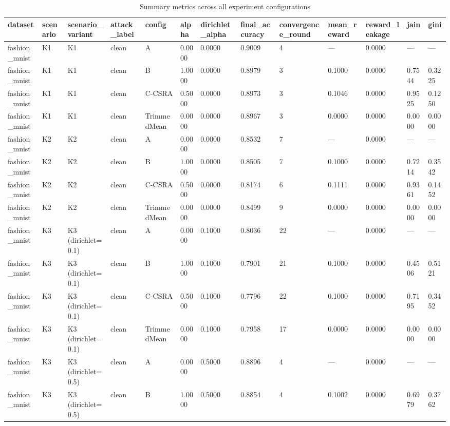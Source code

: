 \begin{table}[htbp]
\centering
\caption{Summary metrics across all experiment configurations}
\label{tab:summary}
\begin{tabular}{lllllllllllll}
\toprule
\textbf{dataset} & \textbf{scenario} & \textbf{scenario_variant} & \textbf{attack_label} & \textbf{config} & \textbf{alpha} & \textbf{dirichlet_alpha} & \textbf{final_accuracy} & \textbf{convergence_round} & \textbf{mean_reward} & \textbf{reward_leakage} & \textbf{jain} & \textbf{gini} \\
\midrule
fashion_mnist & K1 & K1 & clean & A & 0.0000 & 0.0000 & 0.9009 & 4 & — & 0.0000 & — & — \\
fashion_mnist & K1 & K1 & clean & B & 1.0000 & 0.0000 & 0.8979 & 3 & 0.1000 & 0.0000 & 0.7544 & 0.3225 \\
fashion_mnist & K1 & K1 & clean & C-CSRA & 0.5000 & 0.0000 & 0.8973 & 3 & 0.1046 & 0.0000 & 0.9525 & 0.1250 \\
fashion_mnist & K1 & K1 & clean & TrimmedMean & 0.0000 & 0.0000 & 0.8967 & 3 & 0.0000 & 0.0000 & 0.0000 & 0.0000 \\
fashion_mnist & K2 & K2 & clean & A & 0.0000 & 0.0000 & 0.8532 & 7 & — & 0.0000 & — & — \\
fashion_mnist & K2 & K2 & clean & B & 1.0000 & 0.0000 & 0.8505 & 7 & 0.1000 & 0.0000 & 0.7214 & 0.3542 \\
fashion_mnist & K2 & K2 & clean & C-CSRA & 0.5000 & 0.0000 & 0.8174 & 6 & 0.1111 & 0.0000 & 0.9361 & 0.1452 \\
fashion_mnist & K2 & K2 & clean & TrimmedMean & 0.0000 & 0.0000 & 0.8499 & 9 & 0.0000 & 0.0000 & 0.0000 & 0.0000 \\
fashion_mnist & K3 & K3 (dirichlet=0.1) & clean & A & 0.0000 & 0.1000 & 0.8036 & 22 & — & 0.0000 & — & — \\
fashion_mnist & K3 & K3 (dirichlet=0.1) & clean & B & 1.0000 & 0.1000 & 0.7901 & 21 & 0.1000 & 0.0000 & 0.4506 & 0.5121 \\
fashion_mnist & K3 & K3 (dirichlet=0.1) & clean & C-CSRA & 0.5000 & 0.1000 & 0.7796 & 22 & 0.1000 & 0.0000 & 0.7195 & 0.3452 \\
fashion_mnist & K3 & K3 (dirichlet=0.1) & clean & TrimmedMean & 0.0000 & 0.1000 & 0.7958 & 17 & 0.0000 & 0.0000 & 0.0000 & 0.0000 \\
fashion_mnist & K3 & K3 (dirichlet=0.5) & clean & A & 0.0000 & 0.5000 & 0.8896 & 4 & — & 0.0000 & — & — \\
fashion_mnist & K3 & K3 (dirichlet=0.5) & clean & B & 1.0000 & 0.5000 & 0.8854 & 4 & 0.1002 & 0.0000 & 0.6979 & 0.3762 \\

\end{tabular}
\end{table}
